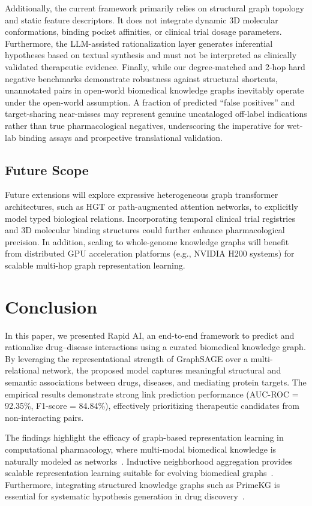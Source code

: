\documentclass[preprint,12pt]{elsarticle}
\begin{document}
Additionally, the current framework primarily relies on structural graph topology and static feature descriptors. It does not integrate dynamic 3D molecular conformations, binding pocket affinities, or clinical trial dosage parameters. Furthermore, the LLM-assisted rationalization layer generates inferential hypotheses based on textual synthesis and must not be interpreted as clinically validated therapeutic evidence. Finally, while our degree-matched and 2-hop hard negative benchmarks demonstrate robustness against structural shortcuts, unannotated pairs in open-world biomedical knowledge graphs inevitably operate under the open-world assumption. A fraction of predicted ``false positives'' and target-sharing near-misses may represent genuine uncataloged off-label indications rather than true pharmacological negatives, underscoring the imperative for wet-lab binding assays and prospective translational validation.

\subsection{Future Scope}
Future extensions will explore expressive heterogeneous graph transformer architectures, such as HGT or path-augmented attention networks, to explicitly model typed biological relations. Incorporating temporal clinical trial registries and 3D molecular binding structures could further enhance pharmacological precision. In addition, scaling to whole-genome knowledge graphs will benefit from distributed GPU acceleration platforms (e.g., NVIDIA H200 systems) for scalable multi-hop graph representation learning.

\section{Conclusion}
In this paper, we presented Rapid AI, an end-to-end framework to predict and rationalize drug--disease interactions using a curated biomedical knowledge graph. By leveraging the representational strength of GraphSAGE over a multi-relational network, the proposed model captures meaningful structural and semantic associations between drugs, diseases, and mediating protein targets. The empirical results demonstrate strong link prediction performance (AUC-ROC = 92.35\%, F1-score = 84.84\%), effectively prioritizing therapeutic candidates from non-interacting pairs.

The findings highlight the efficacy of graph-based representation learning in computational pharmacology, where multi-modal biomedical knowledge is naturally modeled as networks~\cite{ref3,ref4}. Inductive neighborhood aggregation provides scalable representation learning suitable for evolving biomedical graphs~\cite{ref1}. Furthermore, integrating structured knowledge graphs such as PrimeKG is essential for systematic hypothesis generation in drug discovery~\cite{ref6,ref7,ref29}.
\end{document}
